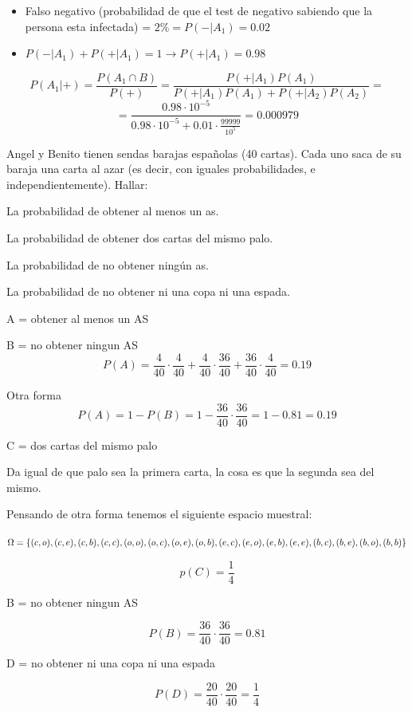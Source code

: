\begin{problem}[3]
\begin{expla}
\begin{itemize}
\item Falso negativo (probabilidad de que el test de negativo sabiendo que la persona esta infectada) = $2\% = P(-|A_1)=0.02$

\item $P(-|A_1)+P(+|A_1)=1 \rightarrow P(+|A_1)=0.98$
\end{itemize}

\end{expla}



\[
P(A_1|+)=\frac{P(A_1\cap B)}{P(+)}=\frac{P(+|A_1)P(A_1)}{P(+|A_1)P(A_1)+P(+|A_2)P(A_2)}=
\]
\[
=\frac{0.98\cdot10^{-5}}{0.98\cdot10^{-5}+0.01\cdot\frac{99999}{10^5}}=0.000979
\]

\end{problem}


\begin{problem}[4]Angel y Benito tienen sendas barajas espa\~nolas (40 cartas). Cada uno saca de su
baraja una carta al azar (es decir, con iguales probabilidades, e independientemente). Hallar:

\ppart La probabilidad de obtener al menos un as. 

\ppart La probabilidad de obtener dos cartas del mismo palo. 

\ppart La probabilidad de no obtener ning\'un as.

\ppart La probabilidad de no obtener ni una copa ni una espada.
\solution

\begin{expla}

\end{expla}

\spart
A = obtener al menos un AS

B = no obtener ningun AS
\[
P(A)=\frac{4}{40}\cdot\frac{4}{40}+\frac{4}{40}\cdot\frac{36}{40}+\frac{36}{40}\cdot\frac{4}{40} = 0.19
\]

Otra forma
\[
P(A)=1-P(B)=1-\frac{36}{40}\cdot\frac{36}{40} = 1 - 0.81 = 0.19
\]

\spart
C = dos cartas del mismo palo

Da igual de que palo sea la primera carta, la cosa es que la segunda sea del mismo.

Pensando de otra forma tenemos el siguiente espacio muestral:

$\Omega = \{(c, o),(c, e),(c, b),(c, c),(o, o),(o, c),(o, e),(o, b),(e, c),(e, o),(e, b),(e, e),(b, c),(b, e)\\,(b, o),(b, b)\}$

\[
p(C)=\frac{1}{4}
\]

\spart
B = no obtener ningun AS

\[
P(B)=\frac{36}{40}\cdot\frac{36}{40} = 0.81
\]

\spart
D = no obtener ni una copa ni una espada

\[
P(D) = \frac{20}{40}\cdot\frac{20}{40}=\frac{1}{4}
\]


\end{problem}

